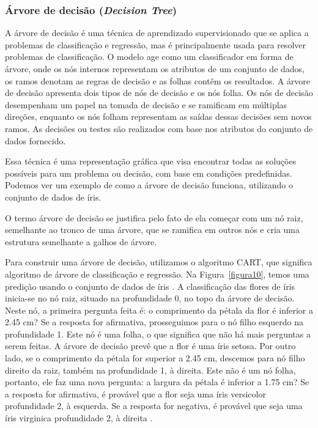 \subsubsection{Árvore de decisão (\textit{Decision Tree})}
A árvore de decisão é uma técnica de aprendizado supervisionado que se aplica a
problemas de classificação e regressão, mas é principalmente usada para resolver problemas de
classificação. O modelo age como um classificador em forma de árvore, onde os nós internos
representam os atributos de um conjunto de dados, os ramos denotam as regras de decisão e as
folhas contêm os resultados. A árvore de decisão apresenta dois tipos de nós de decisão e os
nós folha. Os nós de decisão desempenham um papel na tomada de decisão e se ramificam em
múltiplas direções, enquanto os nós folham representam as saídas dessas decisões sem novos
ramos. As decisões ou testes são realizados com base nos atributos do conjunto de dados
fornecido.

Essa técnica é uma representação gráfica que visa encontrar todas as soluções
possíveis para um problema ou decisão, com base em condições predefinidas. Podemos ver um
exemplo de como a árvore de decisão funciona, utilizando o conjunto de dados de íris. 

O termo árvore de decisão se justifica pelo fato de ela começar com um nó raiz, semelhante ao tronco
de uma árvore, que se ramifica em outros nós e cria uma estrutura semelhante a galhos de
árvore. 

Para construir uma árvore de decisão, utilizamos o algoritmo CART, que significa
algoritmo de árvore de classificação e regressão. Na Figura~\ref{figura10}, temos uma predição usando o
conjunto de dados de íris \cite{fisher1936iris}. A classificação das flores
de íris inicia-se no nó raiz, situado na profundidade 0, no topo da árvore de decisão. Neste nó,
a primeira pergunta feita é: o comprimento da pétala da flor é inferior a 2.45 cm? Se a resposta
for afirmativa, prosseguimos para o nó filho esquerdo na profundidade 1. Este nó é
uma folha, o que significa que não há mais perguntas a serem feitas. A árvore de decisão prevê
que a flor é uma íris setosa. Por outro lado, se o comprimento da pétala for superior a 2.45 cm,
descemos para nó filho direito da raiz, também na profundidade 1, à direita. Este não é um nó
folha, portanto, ele faz uma nova pergunta: a largura da pétala é inferior a 1.75 cm? Se a
resposta for afirmativa, é provável que a flor seja uma íris versicolor profundidade 2, à esquerda.
Se a resposta for negativa, é provável que seja uma íris virginica profundidade 2, à direita \cite{geron2017handson}.

